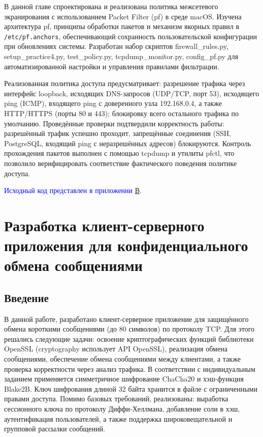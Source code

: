 \documentclass[areasetadvanced]{scrartcl}
\begin{document}
В данной главе спроектирована и реализована политика межсетевого экранирования с использованием Packet Filter (pf) в среде macOS. Изучена архитектура pf, принципы обработки пакетов и механизм якорных правил в \texttt{/etc/pf.anchors}, обеспечивающий сохранность пользовательской конфигурации при обновлениях системы. Разработан набор скриптов firewall\_rules.py, setup\_practice4.py, test\_policy.py, tcpdump\_monitor.py, config\_pf.py для автоматизированной настройки и управления правилами фильтрации.

Реализованная политика доступа предусматривает: разрешение трафика через интерфейс loopback, исходящих DNS-запросов (UDP/TCP, порт 53), исходящего ping (ICMP), входящего ping с доверенного узла 192.168.0.4, а также HTTP/HTTPS (порты 80 и 443); блокировку всего остального трафика по умолчанию. Проведённые проверки подтвердили корректность работы: разрешённый трафик успешно проходит, запрещённые соединения (SSH, PostgreSQL, входящий ping с неразрешённых адресов) блокируются. Контроль прохождения пакетов выполнен с помощью tcpdump и утилиты pfctl, что позволило верифицировать соответствие фактического поведения политике доступа.

\textcolor{blue}{Исходный код представлен в приложении \hyperref[sec:pril4]{В}}.

\newpage
\section{Разработка клиент-серверного приложения для конфиденциального обмена сообщениями}

\subsection{Введение}
В данной работе, разработано клиент-серверное приложение для защищённого обмена короткими сообщениями (до 80 символов) по протоколу TCP. 
Для этого решались следующие задачи: освоение криптографических функций библиотеки OpenSSL (cryptography использует API OpenSSL), 
реализация обмена сообщениями, обеспечение обмена сообщениями между клиентами, а также проверка корректности через анализ трафика. 
В соответствии с индивидуальным заданием применяется симметричное шифрование ChaCha20 и хэш-функция Blake2B. Ключ шифрования длиной 32 байта хранится в файле с ограниченными правами доступа.
Помимо базовых требований, реализованы: выработка сессионного ключа по протоколу Диффи‑Хеллмана, добавление соли в хэш, аутентификация пользователей, а также поддержка широковещательной и групповой рассылки сообщений.
\end{document}
